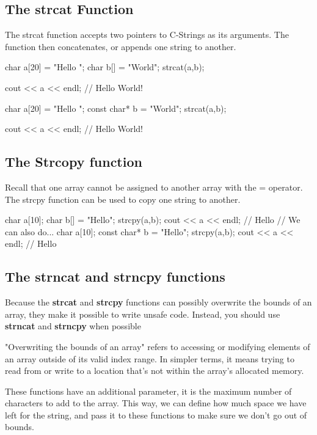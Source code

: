\documentclass{report}
\begin{document}
    \pagebreak \bigbreak \noindent 
    \subsection{The strcat Function}
    \bigbreak \noindent 
    The strcat function accepts two pointers to C-Strings as its arguments. The function then concatenates, or appends one string to another.
    \bigbreak \noindent 
    
    \begin{cppcode}
char a[20] = "Hello ";
char b[] = "World";
strcat(a,b);

cout << a << endl; // Hello World!

char a[20] = "Hello ";
const char* b = "World";
strcat(a,b);

cout << a << endl; // Hello World!
    \end{cppcode}
    
    \bigbreak \noindent 

    \bigbreak \noindent 
    \subsection{The Strcopy function}
    \bigbreak \noindent 
    Recall that one array cannot be assigned to another array with the = operator. The strcpy function can be used to copy one string to another.
    \bigbreak \noindent 
    
    \begin{cppcode}
char a[10];
char b[] = "Hello";
strcpy(a,b);
cout << a << endl; // Hello
// We can also do...
char a[10];
const char* b = "Hello";
strcpy(a,b);
cout << a << endl; // Hello
    \end{cppcode}
    
    \bigbreak \noindent 
    \bigbreak \noindent 

    \pagebreak \bigbreak \noindent 
    \subsection{The strncat and strncpy functions}
    \bigbreak \noindent 
    Because the \textbf{strcat} and \textbf{strcpy} functions can possibly overwrite the bounds of an array, they make it possible to write unsafe code. Instead, you should use \textbf{strncat} and \textbf{strncpy} when possible
    \bigbreak \noindent 
    \begin{remark}
       "Overwriting the bounds of an array" refers to accessing or modifying elements of an array outside of its valid index range. In simpler terms, it means trying to read from or write to a location that's not within the array's allocated memory.
    \end{remark}
    \bigbreak \noindent 
    These functions have an additional parameter, it is the maximum number of characters to add to the array. This way, we can define how much space we have left for the string, and pass it to these functions to make sure we don't go out of bounds.
    \bigbreak \noindent 
    
\end{document}
